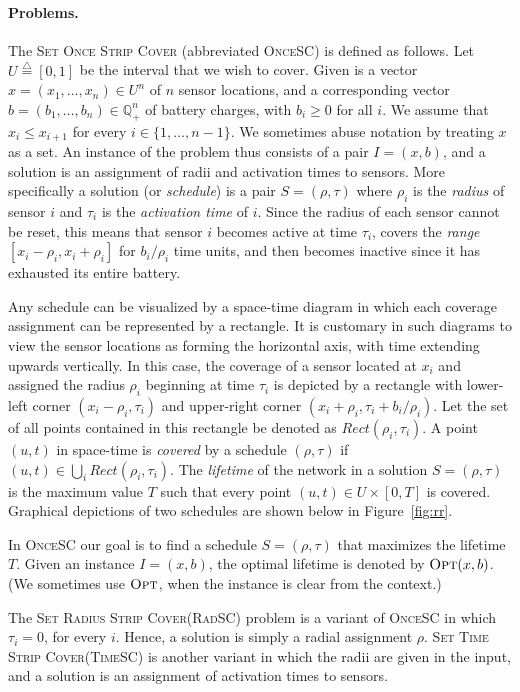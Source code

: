 \documentclass[11pt]{article}
\newcommand{\eqdf}{\stackrel{\scriptscriptstyle \triangle}{=}}
\newcommand{\sosc}{\textsc{OnceSC}\xspace}
\newcommand{\srsc}{\textsc{RadSC}\xspace}
\newcommand{\stsc}{\textsc{TimeSC}\xspace}
\newcommand{\srsclong}{\textsc{Set Radius Strip Cover}\xspace}
\newcommand{\stsclong}{\textsc{Set Time Strip Cover}\xspace}
\newcommand{\opt}{\textsc{Opt}\xspace}
\begin{document}
\paragraph*{\bf Problems.}
The \textsc{Set Once Strip Cover} (abbreviated \sosc) is defined as
follows. Let $U \eqdf [0,1]$ be the interval that we wish to cover.
Given is a vector $x = (x_1,\ldots,x_n) \in U^n$ of $n$ sensor
locations, and a corresponding vector $b = (b_1,\ldots,b_n) \in
\mathbb{Q}_+^n$ of battery charges, with $b_i \geq 0$ for all $i$.  We
assume that $x_i \leq x_{i+1}$ for every $i \in \{1,\ldots,n-1\}$.  We
sometimes abuse notation by treating $x$ as a set.  An instance of the
problem thus consists of a pair $I = (x,b)$, and a solution is an
assignment of radii and activation times to sensors.  More
specifically a solution (or \emph{schedule}) is a pair $S =
(\rho,\tau)$ where $\rho_i$ is the \emph{radius} of sensor $i$ and
$\tau_i$ is the \emph{activation time} of $i$. Since the radius of
each sensor cannot be reset, this means that sensor $i$ becomes active
at time $\tau_i$, covers the \emph{range} $[x_i - \rho_i, x_i +
\rho_i]$ for $b_i/\rho_i$ time units, and then becomes inactive since
it has exhausted its entire battery.

Any schedule can be visualized by a space-time diagram in which each
coverage assignment can be represented by a rectangle. It is customary
in such diagrams to view the sensor locations as forming the
horizontal axis, with time extending upwards vertically. In this case,
the coverage of a sensor located at $x_i$ and assigned the radius
$\rho_i$ beginning at time $\tau_i$ is depicted by a rectangle with
lower-left corner $(x_i - \rho_i, \tau_i)$ and upper-right corner
$(x_i + \rho_i, \tau_i + b_i/\rho_i)$. Let the set of all points
contained in this rectangle be denoted as $Rect(\rho_i, \tau_i)$.
A point $(u,t)$ in space-time is \emph{covered} by a schedule $(\rho,
\tau)$ if $(u,t) \in \bigcup_{i} Rect(\rho_i, \tau_i)$. The
\emph{lifetime} of the network in a solution $S = (\rho,\tau)$ is the
maximum value $T$ such that every point $(u,t) \in U \times [0,T]$ is
covered. Graphical depictions of two schedules are shown below in
Figure~\ref{fig:rr}.

In \sosc our goal is to find a schedule $S=(\rho,\tau)$ that maximizes
the lifetime $T$. Given an instance $I = (x,b)$, the optimal lifetime
is denoted by $\opt(x,b)$.  (We sometimes use $\opt$, when the
instance is clear from the context.)

The \srsclong (\srsc) problem is a variant of \sosc in which
$\tau_i=0$, for every $i$.  Hence, a solution is simply a radial
assignment $\rho$.  \stsclong (\stsc) is another variant in which the
radii are given in the input, and a solution is an assignment of
activation times to sensors.
\end{document}
